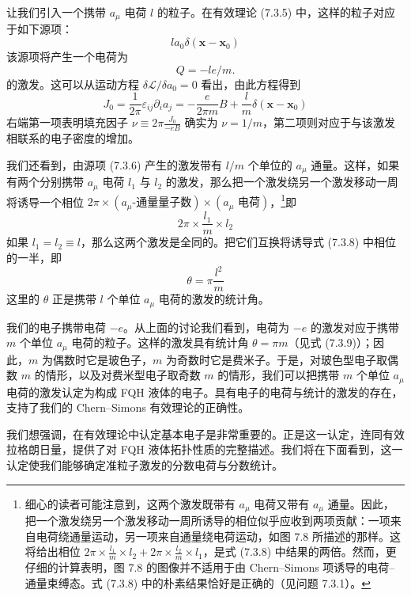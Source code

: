 让我们引入一个携带 $a_\mu$ 电荷 $l$ 的粒子。在有效理论 (7.3.5) 中，这样的粒子对应于如下源项：
\begin{equation*}
la_0\delta(\pmb{x}-\pmb{x}_0)
\tag{7.3.6}
\end{equation*}
该源项将产生一个电荷为
\begin{equation*}
Q=-le/m.
\tag{7.3.7}
\end{equation*}
的激发。这可以从运动方程 $\delta\mathcal{L}/\delta a_0=0$ 看出，由此方程得到
\begin{equation*}
J_0=\frac{1}{2\pi}\varepsilon_{ij}\partial_i a_j=-\frac{e}{2\pi m}B+\frac{l}{m}\delta(\pmb{x}-\pmb{x}_0)
\end{equation*}
右端第一项表明填充因子 $\nu\equiv 2\pi\frac{J_0}{-eB}$ 确实为 $\nu=1/m$，第二项则对应于与该激发相联系的电子密度的增加。

我们还看到，由源项 (7.3.6) 产生的激发带有 $l/m$ 个单位的 $a_\mu$ 通量。这样，如果有两个分别携带 $a_\mu$ 电荷 $l_1$ 与 $l_2$ 的激发，那么把一个激发绕另一个激发移动一周将诱导一个相位 $2\pi\times(a_\mu\text{-通量量子数})\times(a_\mu\text{ 电荷})$，\footnote{细心的读者可能注意到，这两个激发既带有 $a_\mu$ 电荷又带有 $a_\mu$ 通量。因此，把一个激发绕另一个激发移动一周所诱导的相位似乎应收到两项贡献：一项来自电荷绕通量运动，另一项来自通量绕电荷运动，如图 7.8 所描述的那样。这将给出相位 $2\pi\times\frac{l_1}{m}\times l_2+2\pi\times\frac{l_2}{m}\times l_1$，是式 (7.3.8) 中结果的两倍。然而，更仔细的计算表明，图 7.8 的图像并不适用于由 Chern--Simons 项诱导的电荷--通量束缚态。式 (7.3.8) 中的朴素结果恰好是正确的（见问题 7.3.1）。}即
\begin{equation*}
2\pi\times\frac{l_1}{m}\times l_2
\tag{7.3.8}
\end{equation*}
如果 $l_1=l_2\equiv l$，那么这两个激发是全同的。把它们互换将诱导式 (7.3.8) 中相位的一半，即
\begin{equation*}
\theta=\pi\frac{l^2}{m}
\tag{7.3.9}
\end{equation*}
这里的 $\theta$ 正是携带 $l$ 个单位 $a_\mu$ 电荷的激发的统计角。

我们的电子携带电荷 $-e$。从上面的讨论我们看到，电荷为 $-e$ 的激发对应于携带 $m$ 个单位 $a_\mu$ 电荷的粒子。这样的激发具有统计角 $\theta=\pi m$（见式 (7.3.9)）；因此，$m$ 为偶数时它是玻色子，$m$ 为奇数时它是费米子。于是，对玻色型电子取偶数 $m$ 的情形，以及对费米型电子取奇数 $m$ 的情形，我们可以把携带 $m$ 个单位 $a_\mu$ 电荷的激发认定为构成 FQH 液体的电子。具有电子的电荷与统计的激发的存在，支持了我们的 Chern--Simons 有效理论的正确性。

我们想强调，在有效理论中认定基本电子是非常重要的。正是这一认定，连同有效拉格朗日量，提供了对 FQH 液体拓扑性质的完整描述。我们将在下面看到，这一认定使我们能够确定准粒子激发的分数电荷与分数统计。

